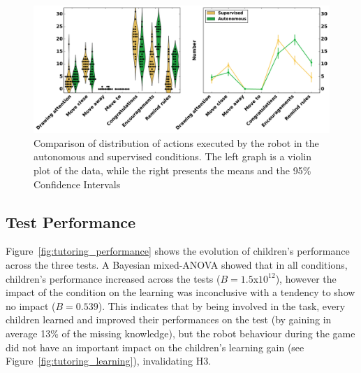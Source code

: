 \begin{figure}[ht]
	\includegraphics[width=1\linewidth]{actions.pdf}
	\centering
	\caption{Comparison of distribution of actions executed by the robot in the autonomous and supervised conditions. The left graph is a violin plot of the data, while the right presents the means and the 95\% Confidence Intervals}
	\label{fig:tutoring_actions_distribution}
\end{figure}


%


\subsection{Test Performance}

Figure~\ref{fig:tutoring_performance} shows the evolution of children's performance across the three tests. A Bayesian mixed-ANOVA showed that in all conditions, children's performance increased across the tests ($B=1.5$x$10^{12}$), however the impact of the condition on the learning was inconclusive with a tendency to show no impact ($B=0.539$). This indicates that by being involved in the task, every children learned and improved their performances on the test (by gaining in average 13\% of the missing knowledge), but the robot behaviour during the game did not have an important impact on the children's learning gain (see Figure~\ref{fig:tutoring_learning}), invalidating H3. %

